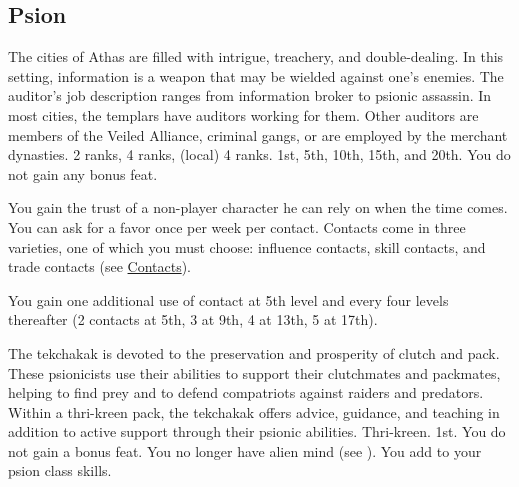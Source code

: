 \subsection{Psion}
{The cities of Athas are filled with intrigue, treachery, and double-dealing. In this setting, information is a weapon that may be wielded against one’s enemies. The auditor’s job description ranges from information broker to psionic assassin. In most cities, the templars have auditors working for them. Other auditors are members of the Veiled Alliance, criminal gangs, or are employed by the merchant dynasties.}
{ 2 ranks,  4 ranks,  (local) 4 ranks.}
{1st, 5th, 10th, 15th, and 20th.}
{You do not gain any bonus feat.}
{
	You gain the trust of a non-player character he can rely on when the time comes. You can ask for a favor once per week per contact. Contacts come in three varieties, one of which you must choose: influence contacts, skill contacts, and trade contacts (see \hyperref[sec:contacts]{Contacts}).

	You gain one additional use of contact at 5th level and every four levels thereafter (2 contacts at 5th, 3 at 9th, 4 at 13th, 5 at 17th).
}

{The tekchakak is devoted to the preservation and prosperity of clutch and pack. These psionicists use their abilities to support their clutchmates and packmates, helping to find prey and to defend compatriots against raiders and predators. Within a
thri-kreen pack, the tekchakak offers advice, guidance, and teaching in addition to active support through their psionic abilities.}
{Thri-kreen.}
{1st.}
{You do not gain a bonus feat.}
{
	You no longer have alien mind (see ). You add  to your psion class skills.
}

